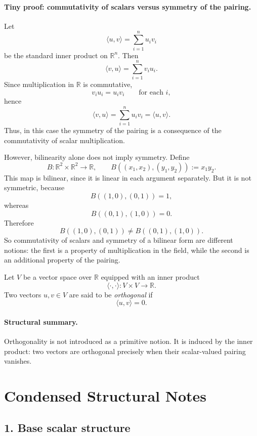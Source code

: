 \documentclass{article}
\begin{document}
	\paragraph{Tiny proof: commutativity of scalars versus symmetry of the pairing.}
	Let
	$$
	\langle u,v\rangle=\sum_{i=1}^n u_i v_i
	$$
	be the standard inner product on $\mathbb{R}^n$. Then
	$$
	\langle v,u\rangle=\sum_{i=1}^n v_i u_i.
	$$
	Since multiplication in $\mathbb{R}$ is commutative,
	$$
	v_i u_i=u_i v_i
	\qquad
	\text{for each }i,
	$$
	hence
	$$
	\langle v,u\rangle=\sum_{i=1}^n u_i v_i=\langle u,v\rangle.
	$$
	Thus, in this case the symmetry of the pairing is a consequence of the commutativity of scalar multiplication.
	
	However, bilinearity alone does not imply symmetry. Define
	$$
	B:\mathbb{R}^2\times\mathbb{R}^2\to\mathbb{R},
	\qquad
	B((x_1,x_2),(y_1,y_2)):=x_1y_2.
	$$
	This map is bilinear, since it is linear in each argument separately. But it is not symmetric, because
	$$
	B((1,0),(0,1))=1,
	$$
	whereas
	$$
	B((0,1),(1,0))=0.
	$$
	Therefore
	$$
	B((1,0),(0,1))\neq B((0,1),(1,0)).
	$$
	So commutativity of scalars and symmetry of a bilinear form are different notions: the first is a property of multiplication in the field, while the second is an additional property of the pairing.
	
	\begin{definition}[Orthogonality]
		Let $V$ be a vector space over $\mathbb{R}$ equipped with an inner product
		$$
		\langle\cdot,\cdot\rangle:V\times V\to\mathbb{R}.
		$$
		Two vectors $u,v\in V$ are said to be \emph{orthogonal} if
		$$
		\langle u,v\rangle=0.
		$$
	\end{definition}
	
	\paragraph{Structural summary.}
	Orthogonality is not introduced as a primitive notion. It is induced by the inner product: two vectors are orthogonal precisely when their scalar-valued pairing vanishes.
	
	\section{Condensed Structural Notes}
	
	\subsection*{1. Base scalar structure}
	
\end{document}
